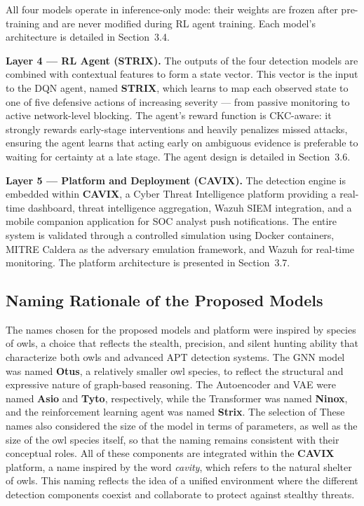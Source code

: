 All four models operate in inference-only mode: their weights are frozen after pre-training and are never modified during RL agent training. Each model's architecture is detailed in Section~3.4.

\textbf{Layer 4 --- RL Agent (STRIX).}
The outputs of the four detection models are combined with contextual features to form a state vector. This vector is the input to the DQN agent, named \textbf{STRIX}, which learns to map each observed state to one of five defensive actions of increasing severity --- from passive monitoring to active network-level blocking. The agent's reward function is CKC-aware: it strongly rewards early-stage interventions and heavily penalizes missed attacks, ensuring the agent learns that acting early on ambiguous evidence is preferable to waiting for certainty at a late stage. The agent design is detailed in Section~3.6.

\textbf{Layer 5 --- Platform and Deployment (CAVIX).}
The detection engine is embedded within \textbf{CAVIX}, a Cyber Threat Intelligence platform providing a real-time dashboard, threat intelligence aggregation, Wazuh SIEM integration, and a mobile companion application for SOC analyst push notifications. The entire system is validated through a controlled simulation using Docker containers, MITRE Caldera as the adversary emulation framework, and Wazuh for real-time monitoring. The platform architecture is presented in Section~3.7.

\subsection{Naming Rationale of the Proposed Models}

The names chosen for the proposed models and platform were inspired by species of owls, a choice that reflects the stealth, precision, and silent hunting ability that characterize both owls and advanced APT detection systems. The GNN model was named \textbf{Otus}, a relatively smaller owl species, to reflect the structural and expressive nature of graph-based reasoning. The Autoencoder and VAE were named \textbf{Asio} and \textbf{Tyto}, respectively, while the Transformer was named \textbf{Ninox}, and the reinforcement learning agent was named \textbf{Strix}. The selection of These names also considered the size of the model in terms of parameters, as well as the size of the owl species itself, so that the naming remains consistent with their conceptual roles. All of these components are integrated within the \textbf{CAVIX} platform, a name inspired by the word \textit{cavity}, which refers to the natural shelter of owls. This naming reflects the idea of a unified environment where the different detection components coexist and collaborate to protect against stealthy threats.

